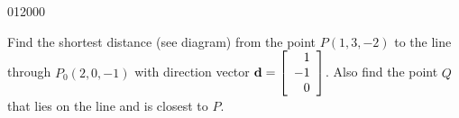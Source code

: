 \begin{example}{}{012000}
\begin{wrapfigure}[3]{l}{4cm}
\vspace*{-1em}
\centering

\end{wrapfigure}

\setlength{\rightskip}{0pt plus 200pt}
Find the shortest distance (see diagram) from the point $P(1, 3, -2)$ to the line through $P_{0}(2, 0, -1)$ with direction vector $ \textbf{d} = \left[
\begin{array}{r}
1\\
-1 \\
0
\end{array}
\right]$. Also find the point $Q$ that lies on the line and is closest to $P$.


\end{example}
